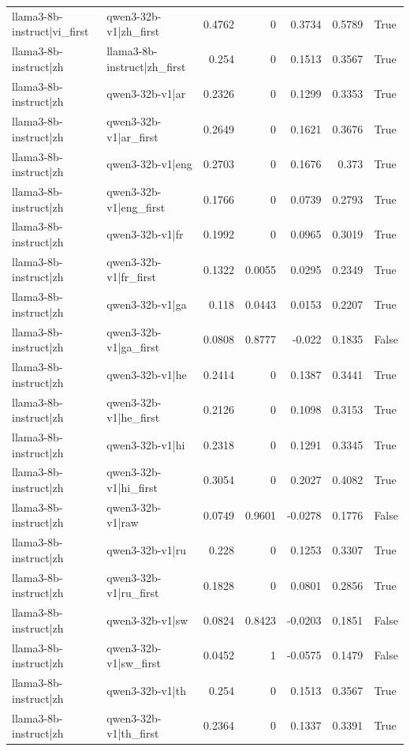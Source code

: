 \begin{table}
\begin{tabular}{l l r r r r l}
llama3-8b-instruct|vi_first & qwen3-32b-v1|zh_first & 0.4762 & 0 & 0.3734 & 0.5789 & True \\
llama3-8b-instruct|zh & llama3-8b-instruct|zh_first & 0.254 & 0 & 0.1513 & 0.3567 & True \\
llama3-8b-instruct|zh & qwen3-32b-v1|ar & 0.2326 & 0 & 0.1299 & 0.3353 & True \\
llama3-8b-instruct|zh & qwen3-32b-v1|ar_first & 0.2649 & 0 & 0.1621 & 0.3676 & True \\
llama3-8b-instruct|zh & qwen3-32b-v1|eng & 0.2703 & 0 & 0.1676 & 0.373 & True \\
llama3-8b-instruct|zh & qwen3-32b-v1|eng_first & 0.1766 & 0 & 0.0739 & 0.2793 & True \\
llama3-8b-instruct|zh & qwen3-32b-v1|fr & 0.1992 & 0 & 0.0965 & 0.3019 & True \\
llama3-8b-instruct|zh & qwen3-32b-v1|fr_first & 0.1322 & 0.0055 & 0.0295 & 0.2349 & True \\
llama3-8b-instruct|zh & qwen3-32b-v1|ga & 0.118 & 0.0443 & 0.0153 & 0.2207 & True \\
llama3-8b-instruct|zh & qwen3-32b-v1|ga_first & 0.0808 & 0.8777 & -0.022 & 0.1835 & False \\
llama3-8b-instruct|zh & qwen3-32b-v1|he & 0.2414 & 0 & 0.1387 & 0.3441 & True \\
llama3-8b-instruct|zh & qwen3-32b-v1|he_first & 0.2126 & 0 & 0.1098 & 0.3153 & True \\
llama3-8b-instruct|zh & qwen3-32b-v1|hi & 0.2318 & 0 & 0.1291 & 0.3345 & True \\
llama3-8b-instruct|zh & qwen3-32b-v1|hi_first & 0.3054 & 0 & 0.2027 & 0.4082 & True \\
llama3-8b-instruct|zh & qwen3-32b-v1|raw & 0.0749 & 0.9601 & -0.0278 & 0.1776 & False \\
llama3-8b-instruct|zh & qwen3-32b-v1|ru & 0.228 & 0 & 0.1253 & 0.3307 & True \\
llama3-8b-instruct|zh & qwen3-32b-v1|ru_first & 0.1828 & 0 & 0.0801 & 0.2856 & True \\
llama3-8b-instruct|zh & qwen3-32b-v1|sw & 0.0824 & 0.8423 & -0.0203 & 0.1851 & False \\
llama3-8b-instruct|zh & qwen3-32b-v1|sw_first & 0.0452 & 1 & -0.0575 & 0.1479 & False \\
llama3-8b-instruct|zh & qwen3-32b-v1|th & 0.254 & 0 & 0.1513 & 0.3567 & True \\
llama3-8b-instruct|zh & qwen3-32b-v1|th_first & 0.2364 & 0 & 0.1337 & 0.3391 & True \\

\end{tabular}
\end{table}

